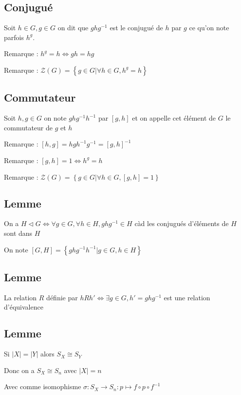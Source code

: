 \documentclass[a4paper,10pt]{article}
\newcommand{\card}[1]{\left\vert #1 \right\vert}
\newcommand{\ap}{\rightarrow}
\newcommand{\ioi}{\Leftrightarrow}
\newcommand{\tset}[1]{\left\lbrace #1 \right\rbrace}
\newcommand{\normal}{\triangleleft}
\begin{document}
\subsection{Conjugué}

Soit $h \in G, g \in G$ on dit que $ghg^{-1}$ est le conjugué de $h$ par $g$ ce qu'on note parfois $h^g$.

Remarque : $h^g = h \ioi gh = hg$ 

Remarque : $\mathcal{Z}(G) = \tset{g \in G \vert \forall h \in G, h^g = h}$

\subsection{Commutateur}


Soit $h, g \in G$ on note $ghg^{-1} h^{-1}$ par $[g,h]$ et on appelle cet élément de $G$ le commutateur de $g$ et $h$

Remarque : $[h,g] = hgh^{-1}g^{-1} = [g,h]^{-1}$

Remarque : $[g,h] = 1 \ioi h^g = h$

Remarque : $\mathcal{Z}(G) = \tset{g \in G \vert \forall h \in G, [g,h] = 1}$

\subsection{Lemme}

On a $H \normal G \ioi \forall g \in G, \forall h \in H, ghg^{-1} \in H$ càd les conjugués d'éléments de $H$ sont dans $H$

On note $[G,H] = \tset{ghg^{-1}h^{-1} \vert g \in G, h \in H}$

\subsection{Lemme}

La relation $R$ définie par $hRh' \ioi \exists g \in G, h' = ghg^{-1}$ est une relation d'équivalence

\subsection{Lemme}

Si $\card{X} = \card{Y}$ alors $S_X \cong S_Y$

Donc on a $S_X \cong S_n$ avec $\card{X} = n$ 

Avec comme isomophisme $\sigma : S_X \ap S_n : p \mapsto f \circ p \circ f^{-1}$
\end{document}
